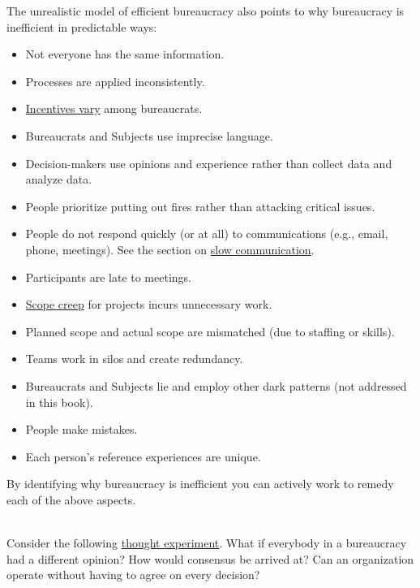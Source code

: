 The unrealistic model of efficient bureaucracy also points to why bureaucracy is inefficient in predictable ways:
\begin{itemize}
    \item Not everyone has the same information.
    \item Processes are applied inconsistently.
    \item \hyperref[sec:motivations]{Incentives vary} among bureaucrats.
    \item Bureaucrats and Subjects use imprecise language.
    \item Decision-makers use opinions and experience rather than collect data and analyze data.
    \item People prioritize putting out fires rather than attacking critical issues.
    \item People do not respond quickly (or at all) to communications (e.g., email, phone, meetings). See the section on \hyperref[sec:slowing-communication]{slow communication}.
    \item Participants are late to meetings.
    \item \hyperref[sec:scope-creep]{Scope creep} 
    for projects incurs unnecessary work.
    \item Planned scope and actual scope are mismatched  (due to staffing or skills).
    \item Teams work in silos and create redundancy.
    \item Bureaucrats and Subjects lie and employ other dark patterns (not addressed in this book).
    \item People make mistakes.
    \item Each person's reference experiences are unique.
\end{itemize}
By identifying why bureaucracy is inefficient you can actively work to remedy each of the above aspects. 

\ \\

Consider the following 
\href{https://en.wikipedia.org/wiki/Thought_experiment}{thought experiment}. 
\iftoggle{WPinmargin}{\marginpar{$>$Wikipedia: thought experiment}}{}
What if everybody in a bureaucracy had a different opinion? How would consensus be arrived at? Can an organization operate without having to agree on every decision? 



